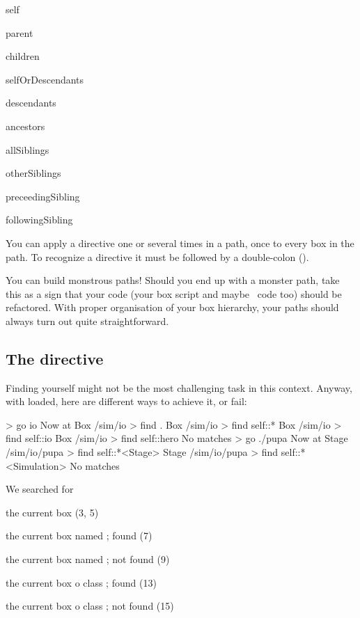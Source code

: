 \begin{compactitem}
\item self
\item parent
\item children
\item selfOrDescendants
\item descendants
\item ancestors
\item allSiblings
\item otherSiblings
\item preceedingSibling
\item followingSibling
\end{compactitem}

You can apply a directive one or several times in a path, once to every box in the path. To recognize a directive it must be followed by a double-colon (\code{::}).

You can build monstrous paths! Should you end up with a monster path, take this as a sign that your code (your box script and maybe \CPP\ code too) should be refactored. With proper organisation of your box hierarchy, your paths should always turn out quite straightforward.

%
%
\subsection{The  directive}
Finding yourself might not be the most challenging task in this context. Anyway, with  loaded, here are different ways to achieve it, or fail:

\lstset{numbers=left}
\begin{usdialog}
> go io
Now at Box /sim/io
> find .
Box /sim/io
> find self::*
Box /sim/io
> find self::io
Box /sim/io
> find self::hero
No matches
> go ./pupa
Now at Stage /sim/io/pupa
> find self::*<Stage>
Stage /sim/io/pupa
> find self::*<Simulation>
No matches
\end{usdialog}
\lstset{numbers=none}

\noindent
We searched for 
\begin{compactitem}
\item the current box (3, 5)
\item the current box named ; found (7)
\item the current box named ; not found (9)
\item the current box o class ; found (13)
\item the current box o class ; not found (15)
\end{compactitem}

